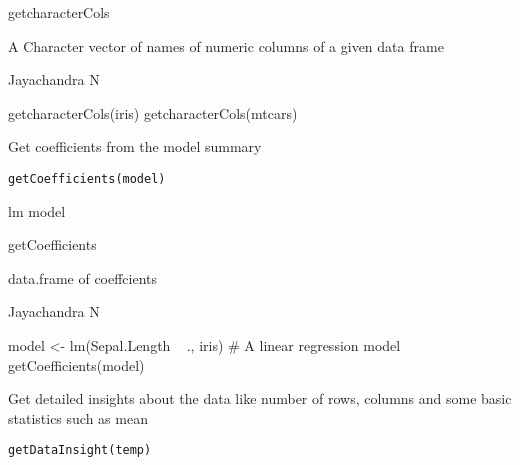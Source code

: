 \documentclass[a4paper]{book}
\begin{document}
%
\begin{Details}\relax
getcharacterCols
\end{Details}
%
\begin{Value}
A Character vector of names of numeric columns of a given data frame
\end{Value}
%
\begin{Author}\relax
Jayachandra N
\end{Author}
%
\begin{Examples}
\begin{ExampleCode}
getcharacterCols(iris)
getcharacterCols(mtcars)
\end{ExampleCode}
\end{Examples}
%
\begin{Description}\relax
Get coefficients from the model summary
\end{Description}
%
\begin{Usage}
\begin{verbatim}
getCoefficients(model)
\end{verbatim}
\end{Usage}
%
\begin{Arguments}
\begin{ldescription}
\item[\code{model}] lm model
\end{ldescription}
\end{Arguments}
%
\begin{Details}\relax
getCoefficients
\end{Details}
%
\begin{Value}
data.frame of coeffcients
\end{Value}
%
\begin{Author}\relax
Jayachandra N
\end{Author}
%
\begin{Examples}
\begin{ExampleCode}
 model <- lm(Sepal.Length ~ ., iris) # A linear regression model
 getCoefficients(model)
\end{ExampleCode}
\end{Examples}
%
\begin{Description}\relax
Get detailed insights about the data like number of rows, columns and some basic statistics such as mean
\end{Description}
%
\begin{Usage}
\begin{verbatim}
getDataInsight(temp)
\end{verbatim}
\end{Usage}
\end{document}

